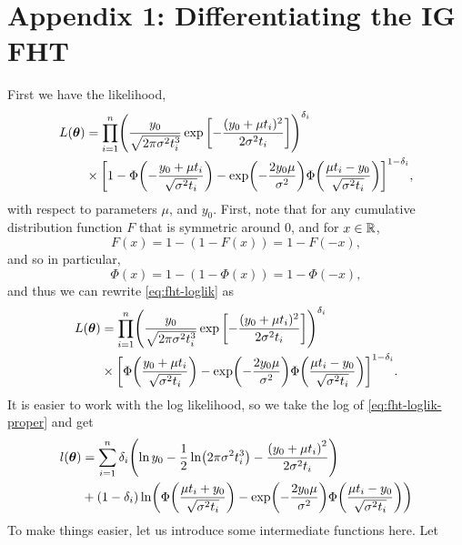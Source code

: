 \chapter{Appendix 1: Differentiating the IG FHT}\label{appendix}
First we have the likelihood,
\begin{align}\label{eq:fht-loglik}
\begin{split}
L(\btheta)&=\prod_{i=1}^n\p*{\frac{y_0}{\sqrt{2\pi\sigma^2\ti^3}}\exp\left[-\frac{(y_0+\mu \ti)^2}{2\sigma^2\ti}\right]}^{\di}\\
&\times\sqb*{1-\Phi\p*{-\frac{y_0+\mu \ti}{\sqrt{\sigma^2\ti}}}-\exp\p*{-\frac{2y_0\mu}{\sigma^2}}\Phi\p*{\frac{\mu \ti-y_0}{\sqrt{\sigma^2\ti}}}}^{1-\di},
\end{split}
\end{align}
with respect to parameters $\mu$, and $y_0$. First, note that for any cumulative distribution function $F$ that is symmetric around 0, and for $x\in\mathbb{R}$,
\begin{equation}
    F(x)=1-(1-F(x))=1-F(-x),
\end{equation}
and so in particular,
\begin{equation}
    \Phi(x)=1-(1-\Phi(x))=1-\Phi(-x),
\end{equation}
and thus we can rewrite \eqref{eq:fht-loglik} as
\begin{align}\label{eq:fht-loglik-proper}
\begin{split}
L(\btheta)&=\prod_{i=1}^n\p*{\frac{y_0}{\sqrt{2\pi\sigma^2\ti^3}}\exp\left[-\frac{(y_0+\mu \ti)^2}{2\sigma^2\ti}\right]}^{\di}\\
&\times\sqb*{\Phi\p*{\frac{y_0+\mu \ti}{\sqrt{\sigma^2\ti}}}-\exp\p*{-\frac{2y_0\mu}{\sigma^2}}\Phi\p*{\frac{\mu \ti-y_0}{\sqrt{\sigma^2\ti}}}}^{1-\di}.
\end{split}
\end{align}
It is easier to work with the log likelihood, so we take the log of \eqref{eq:fht-loglik-proper} and get
\begin{align}
\begin{split}
    l(\btheta)&=\sum_{i=1}^n\di\p*{\ln y_0-\frac{1}{2}\ln\p*{2\pi\sigma^2\ti^3}-\frac{\p*{y_0+\mu\ti}^2}{2\sigma^2\ti}} \\
    &+
    (1-\di)\ln\p*{\Phi\p*{\frac{\mu\ti+y_0}{\sqrt{\sigma^2\ti}}}-\exp\p*{-\frac{2y_0\mu}{\sigma^2}}\Phi\p*{\frac{\mu\ti-y_0}{\sqrt{\sigma^2\ti}}}}
\end{split}
\end{align}
To make things easier, let us introduce some intermediate functions here. Let
